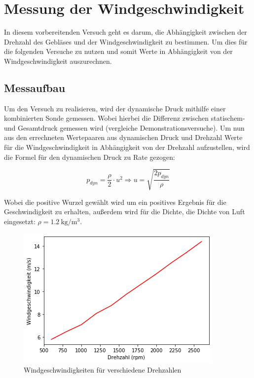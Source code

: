 \section{Messung der Windgeschwindigkeit}

In diesem vorbereitenden Versuch geht es darum, die Abhängigkeit zwischen der Drehzahl des Gebläses und der Windgeschwindigkeit zu bestimmen. Um dies für die folgenden Versuche zu nutzen und somit Werte in Abhängigkeit von der Windgeschwindigkeit auszurechnen.

\subsection{Messaufbau}

Um den Versuch zu realisieren, wird der dynamische Druck mithilfe einer kombinierten Sonde gemessen. Wobei hierbei die Differenz zwischen statischem- und Gesamtdruck gemessen wird (vergleiche Demonstrationsversuche). Um nun aus den errechneten Wertepaaren aus dynamischen Druck und Drehzahl Werte für die Windgeschwindigkeit in Abhängigkeit von der Drehzahl aufzustellen, wird die Formel für den dynamischen Druck zu Rate gezogen: 

\begin{equation}
    p_{dyn} = \frac{\rho}{2} \cdot u^2
    \Rightarrow u = \sqrt{\frac{2p_{dyn}}{\rho}}
\end{equation}

Wobei die positive Wurzel gewählt wird um ein positives Ergebnis für die Geschwindigkeit zu erhalten, außerdem wird für die Dichte, die Dichte von Luft eingesetzt: $\rho = \SI{1.2}{\kg\per\cubic\m}$.

\begin{figure}[h]
    \centering
    \includegraphics[scale=0.8]{Aeromechanik/Protokoll/fig/Aeromechanik Versuch 1.2.png}
    \caption{Windgeschwindigkeiten für verschiedene Drehzahlen}
    \label{fig:Aeromechanik Versuch 1.2}
\end{figure}